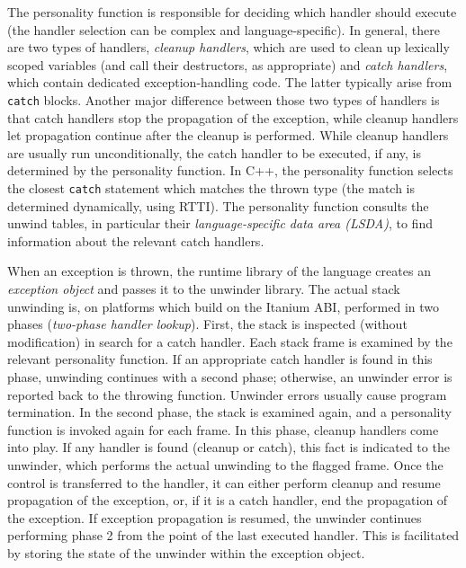 The personality function is responsible for deciding which handler
should execute (the handler selection can be complex and
language-specific). In general, there are two types of handlers,
\emph{cleanup handlers}, which are used to clean up lexically scoped
variables (and call their destructors, as appropriate) and \emph{catch
handlers}, which contain dedicated exception-handling code. The latter
typically arise from \texttt{catch} blocks. Another major difference
between those two types of handlers is that catch handlers stop the
propagation of the exception, while cleanup handlers let propagation
continue after the cleanup is performed. While cleanup handlers are
usually run unconditionally, the catch handler to be executed, if any,
is determined by the personality function. In C++, the personality function selects the
closest \texttt{catch} statement which matches the thrown type (the
match is determined dynamically, using RTTI). The personality function
consults the unwind tables, in particular their \emph{language-specific
data area (LSDA)}, to find information about the relevant catch
handlers.

When an exception is thrown, the runtime library of the language creates
an \emph{exception object} and passes it to the unwinder library. The
actual stack unwinding is, on platforms which build on the Itanium ABI,
performed in two phases (\emph{two-phase handler lookup}).
First, the stack is inspected (without
modification) in search for a catch handler. Each stack frame is
examined by the relevant personality function. If an appropriate catch handler is found in this
phase, unwinding continues with a second phase; otherwise, an unwinder
error is reported back to the throwing function. Unwinder errors usually
cause program termination. In the second phase, the stack is examined
again, and a personality function is invoked again for each frame. In
this phase, cleanup handlers come into play. If any handler is found
(cleanup or catch), this fact is indicated to the unwinder, which
performs the actual unwinding to the flagged frame. Once the control is
transferred to the handler, it can either perform cleanup and resume
propagation of the exception, or, if it is a catch handler, end the
propagation of the exception. If exception propagation is resumed, the
unwinder continues performing phase 2 from the point of the last
executed handler. This is facilitated by storing the state of the
unwinder within the exception object.

